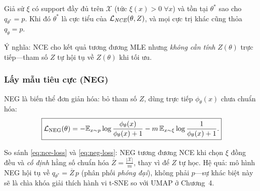 \begin{theorem}
\label{thm:nce}
Giả sử $\xi$ có support đầy đủ trên $\mathcal{X}$ (tức $\xi(x)>0\;\forall x$) và tồn tại $\theta^*$ sao cho $q_{\theta^*} = p$. Khi đó $\theta^*$ là cực tiểu của $\mathcal{L}_{\emph{NCE}}(\theta, Z)$, và mọi cực trị khác cũng thỏa $q_{\tilde{\theta}} = p$.
\end{theorem}

Ý nghĩa: NCE cho kết quả tương đương MLE nhưng \emph{không cần tính} $Z(\theta)$ trực tiếp---tham số $Z$ tự hội tụ về $Z(\theta)$ khi tối ưu.

\subsubsection{Lấy mẫu tiêu cực (NEG)}
\label{sec:neg-def}

NEG \cite{mikolov2013word2vec} là biến thể đơn giản hóa: bỏ tham số $Z$, dùng trực tiếp $\phi_\theta(x)$ chưa chuẩn hóa:
\begin{equation}
\boxed{
\mathcal{L}_{\text{NEG}}(\theta) = -\mathbb{E}_{x \sim p}\log\frac{\phi_\theta(x)}{\phi_\theta(x) + 1}
- m\,\mathbb{E}_{x \sim \xi}\log\frac{1}{\phi_\theta(x) + 1}.
}
\label{eq:neg-loss}
\end{equation}

So sánh \eqref{eq:nce-loss} và \eqref{eq:neg-loss}: NEG tương đương NCE khi chọn $\xi$ đồng đều và \emph{cố định} hằng số chuẩn hóa $\overline{Z} = \frac{|\mathcal{X}|}{m}$, thay vì để $Z$ tự học. Hệ quả: mô hình NEG hội tụ về $q_{\theta^*} = \overline{Z}\,p$ (phân phối \emph{phóng đại}), không phải $p$---sự khác biệt này sẽ là chìa khóa giải thích hành vi t-SNE so với UMAP ở Chương~4.

\FloatBarrier

